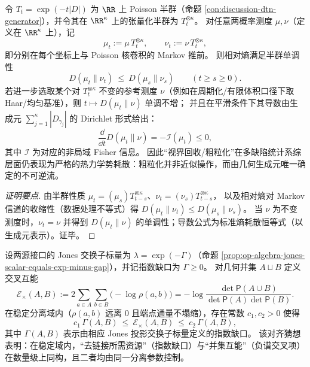 \begin{proposition}\label{prop:xi-pick-poisson-poisson-semigroup-free-energy-dissipation}
令 \(T_t=\exp(-t|D|)\) 为 \(\RR\) 上 Poisson 半群（命题 \ref{con:discussion-dtn-generator}），并令其在 \(\RR^\kappa\) 上的张量化半群为 \(T_t^{\otimes \kappa}\)。
对任意两概率测度 \(\mu,\nu\)（定义在 \(\RR^\kappa\) 上），记
\[
\mu_t:=\mu\,T_t^{\otimes\kappa},\qquad \nu_t:=\nu\,T_t^{\otimes\kappa},
\]
即分别在每个坐标上与 Poisson 核卷积的 Markov 推前。
则相对熵满足半群单调性
\[
\boxed{\;
D(\mu_t\|\nu_t)\ \le\ D(\mu_s\|\nu_s)\qquad(t\ge s\ge 0).\;}
\]
若进一步选取某个对 \(T_t^{\otimes\kappa}\) 不变的参考测度 \(\nu\)（例如在周期化/有限体积口径下取 Haar/均匀基准），则 \(t\mapsto D(\mu_t\|\nu)\) 单调不增；
并且在平滑条件下其导数由生成元 \(\sum_{j=1}^{\kappa}|D_{\gamma_j}|\) 的 Dirichlet 形式给出：
\[
\frac{\dd}{\dd t}D(\mu_t\|\nu)=-\mathcal{I}(\mu_t)\le 0,
\]
其中 \(\mathcal{I}\) 为对应的非局域 Fisher 信息。
因此“视界回收/粗粒化”在多缺陷统计系综层面仍表现为严格的热力学势耗散：粗粒化并非近似操作，而由几何生成元唯一确定的不可逆流。
\end{proposition}
\begin{proof}[证明要点]
由半群性质 \(\mu_t=(\mu_s)T_{t-s}^{\otimes\kappa}\)、\(\nu_t=(\nu_s)T_{t-s}^{\otimes\kappa}\)，
以及相对熵对 Markov 信道的收缩性（数据处理不等式）得
\(
D(\mu_t\|\nu_t)\le D(\mu_s\|\nu_s)
\)。
当 \(\nu\) 为不变测度时，\(\nu_t=\nu\) 并得到 \(D(\mu_t\|\nu)\) 的单调性；导数公式为标准熵耗散恒等式（以生成元表示）。证毕。
\end{proof}

\begin{conjecture}\label{conj:xi-energy-index-gap-comparability}
设两源接口的 Jones 交换子标量为 \(\lambda=\exp(-\Gamma)\)（命题 \ref{prop:op-algebra-jones-scalar-equals-exp-minus-gap}），并记指数缺口为 \(\Gamma\ge 0\)。
对几何并集 \(A\sqcup B\) 定义交叉互能
\[
\mathcal{E}_{\times}(A,B):=2\sum_{a\in A}\sum_{b\in B}\bigl(-\log\rho(a,b)\bigr)
=-\log\frac{\det\mathsf P(A\cup B)}{\det\mathsf P(A)\det\mathsf P(B)}.
\]
在稳定分离域内（\(\rho(a,b)\) 远离 \(0\) 且端点通量不塌缩），存在常数 \(c_1,c_2>0\) 使得
\[
\boxed{\;
c_1\,\Gamma(A,B)\ \le\ \mathcal{E}_{\times}(A,B)\ \le\ c_2\,\Gamma(A,B),\;}
\]
其中 \(\Gamma(A,B)\) 表示由相应 Jones 投影交换子标量定义的指数缺口。
该对齐猜想表明：在稳定域内，“去链接所需资源”（指数缺口）与“并集互能”（负谱交叉项）在数量级上同构，且二者均由同一分离参数控制。
\end{conjecture}



\endinput

